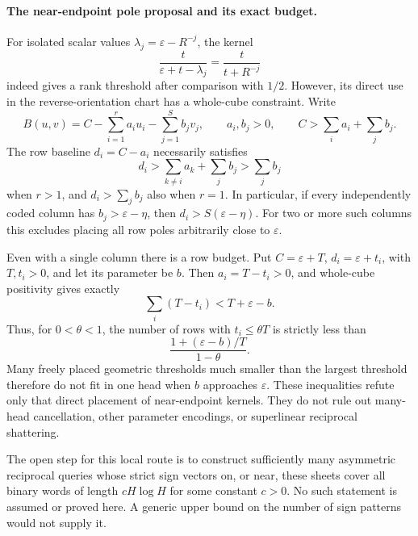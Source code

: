 \documentclass[11pt]{article}
\begin{document}
\paragraph{The near-endpoint pole proposal and its exact budget.}
For isolated scalar values $\lambda_j=\varepsilon-R^{-j}$, the kernel
\[
 \frac{t}{\varepsilon+t-\lambda_j}
 =\frac{t}{t+R^{-j}}
\]
indeed gives a rank threshold after comparison with $1/2$.
However, its direct use in the reverse-orientation chart has a
whole-cube constraint. Write
\[
 B(u,v)=C-\sum_{i=1}^r a_i u_i-\sum_{j=1}^S b_j v_j,
 \qquad a_i,b_j>0,\qquad C>\sum_i a_i+\sum_j b_j.
\]
The row baseline $d_i=C-a_i$ necessarily satisfies
\[
 d_i>\sum_{k\ne i}a_k+\sum_jb_j>\sum_jb_j
\]
when $r>1$, and $d_i>\sum_jb_j$ also when $r=1$.
In particular, if every independently coded column has
$b_j>\varepsilon-\eta$, then $d_i>S(\varepsilon-\eta)$.
For two or more such columns this excludes placing all row poles
arbitrarily close to $\varepsilon$.

Even with a single column there is a row budget. Put
$C=\varepsilon+T$, $d_i=\varepsilon+t_i$, with $T,t_i>0$,
and let its parameter be $b$.
Then $a_i=T-t_i>0$, and whole-cube positivity gives exactly
\[
 \sum_i(T-t_i)<T+\varepsilon-b.
\]
Thus, for $0<\theta<1$, the number of rows with $t_i\le\theta T$
is strictly less than
\[
 \frac{1+(\varepsilon-b)/T}{1-\theta}.
\]
Many freely placed geometric thresholds much smaller than the largest
threshold therefore do not fit in one head when $b$ approaches
$\varepsilon$. These inequalities refute only that direct placement
of near-endpoint kernels. They do not rule out many-head cancellation,
other parameter encodings, or superlinear reciprocal shattering.

The open step for this local route is to construct sufficiently many
asymmetric reciprocal queries whose strict sign vectors on, or near,
these sheets cover all binary words of length $cH\log H$ for some
constant $c>0$. No such statement is assumed or proved here. A generic
upper bound on the number of sign patterns would not supply it.
\end{document}
